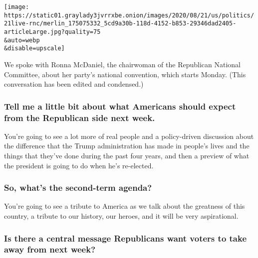 \texttt{[image: https://static01.graylady3jvrrxbe.onion/images/2020/08/21/us/politics/21live-rnc/merlin\_175075332\_5cd9a30b-118d-4152-b853-29346dad2405-articleLarge.jpg?quality=75\\\&auto=webp\\\&disable=upscale]}

We spoke with Ronna McDaniel, the chairwoman of the Republican National
Committee, about her party's national convention, which starts Monday.
(This conversation has been edited and condensed.)

\hypertarget{tell-me-a-little-bit-about-what-americans-should-expect-from-the-republican-side-next-week}{%
\subsubsection{\texorpdfstring{\textbf{Tell me a little bit about what
Americans should expect from the Republican side next
week.}}{Tell me a little bit about what Americans should expect from the Republican side next week.}}\label{tell-me-a-little-bit-about-what-americans-should-expect-from-the-republican-side-next-week}}

You're going to see a lot more of real people and a policy-driven
discussion about the difference that the Trump administration has made
in people's lives and the things that they've done during the past four
years, and then a preview of what the president is going to do when he's
re-elected.

\hypertarget{so-whats-the-second-term-agenda}{%
\subsubsection{\texorpdfstring{\textbf{So, what's the second-term
agenda?}}{So, what's the second-term agenda?}}\label{so-whats-the-second-term-agenda}}

You're going to see a tribute to America as we talk about the greatness
of this country, a tribute to our history, our heroes, and it will be
very aspirational.

\hypertarget{is-there-a-central-message-republicans-want-voters-to-take-away-from-next-week}{%
\subsubsection{\texorpdfstring{\textbf{Is there a central message
Republicans want voters to take away from next
week?}}{Is there a central message Republicans want voters to take away from next week?}}\label{is-there-a-central-message-republicans-want-voters-to-take-away-from-next-week}}

